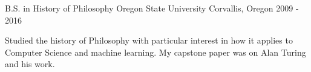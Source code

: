 

\begin{cventries}

  \cventry
    {B.S. in History of Philosophy} %
    {Oregon State University} %
    {Corvallis, Oregon} %
    {2009 - 2016} %
    {
      \begin{cvitems} %
        \item {Studied the history of Philosophy with particular interest in how it applies to Computer Science and machine learning. My capstone paper was on Alan Turing and his work.}
      \end{cvitems}
    }

\end{cventries}
